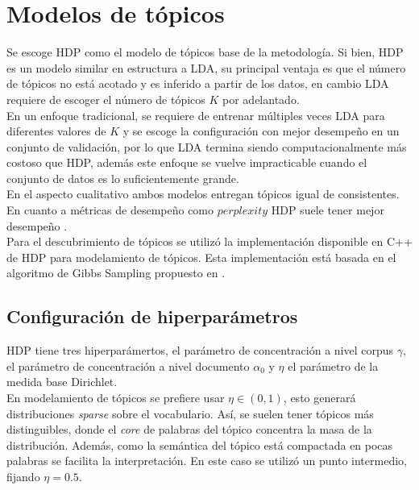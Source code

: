 \section{Modelos de tópicos}
\label{sec:model_selected}

Se escoge HDP como el modelo de tópicos base de la metodología. Si bien, HDP es un modelo similar en estructura a LDA, su principal ventaja es que el número de tópicos no está acotado y es inferido a partir de los datos, en cambio LDA requiere de escoger el número de tópicos $K$ por adelantado. \\

En un enfoque tradicional, se requiere de entrenar múltiples veces LDA para diferentes valores de $K$ y se escoge la configuración con mejor desempeño en un conjunto de validación, por lo que LDA termina siendo computacionalmente más costoso que HDP, además este enfoque se vuelve impracticable cuando el conjunto de datos es lo suficientemente grande. \\

En el aspecto cualitativo ambos modelos entregan tópicos igual de consistentes. En cuanto a métricas de desempeño como $\textit{perplexity}$ HDP suele tener mejor desempeño \citep{teh2005sharing}.\\

Para el descubrimiento de tópicos se utilizó la implementación disponible en C++ \citep{HDP} de HDP para modelamiento de tópicos. Esta implementación está basada en el algoritmo de Gibbs Sampling propuesto en \citep{teh2005sharing}.

\subsection{Configuración de hiperparámetros}
\label{sec:hdp_hiperparameters}

HDP tiene tres hiperparámertos, el parámetro de concentración a nivel corpus $\gamma$, el parámetro de concentración a nivel documento $\alpha_{0}$ y $\eta$ el parámetro de la medida base Dirichlet.\\

En modelamiento de tópicos se prefiere usar $\eta\in (0,1)$, esto generará distribuciones \textit{sparse} sobre el vocabulario. Así, se suelen tener tópicos más distinguibles, donde el \textit{core} de palabras del tópico concentra la masa de la distribución. Además, como la semántica del tópico está compactada en pocas palabras se facilita la interpretación. En este caso se utilizó un punto intermedio, fijando $\eta=0.5$.\\ 

